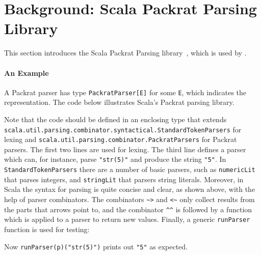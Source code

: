 \section{Background: Scala Packrat Parsing Library}\label{sec:packratparsers}


This section introduces the Scala Packrat Parsing library~\cite{}, which is
used by \name.

\paragraph{An Example}
A Packrat parser has type \lstinline{PackratParser[E]} for some
\lstinline{E}, which indicates the representation. The code below illustrates
Scala's Packrat parsing library.

\noindent

Note that the code should be defined in an enclosing type that extends
\lstinline{scala.util.parsing.combinator.syntactical.StandardTokenParsers}
for lexing and
\lstinline{scala.util.parsing.combinator.PackratParsers} for Packrat
parsers.
The first two lines are used for lexing. The third line defines a
parser which can, for instance, parse \lstinline{"str(5)"} and produce
the string \lstinline{"5"}. In \lstinline{StandardTokenParsers} there
are a number of basic parsers, such as \lstinline{numericLit} that
parses integers, and \lstinline{stringLit} that parsers string
literals. Moreover, in Scala the syntax for parsing
is quite concise and clear, as shown above, with the help of
parser combinators. The combinators \lstinline{~>} and \lstinline{<~} only collect
results from the parts that arrows point to, and the combinator \lstinline{^^} is
followed by a function which is applied to a parser to return new
values. Finally, a generic \lstinline{runParser}
function is used for testing:

Now \lstinline{runParser(p)("str(5)")} prints out \lstinline{"5"} as expected.

